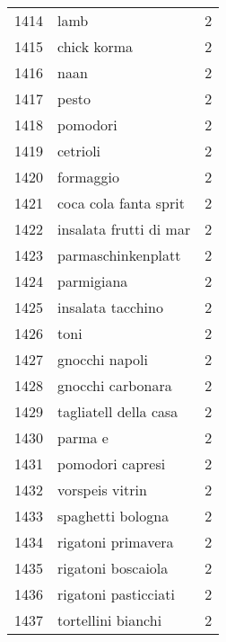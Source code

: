 \begin{tabular}{llr}
1414 &                                               lamb &      2 \\
1415 &                                        chick korma &      2 \\
1416 &                                               naan &      2 \\
1417 &                                              pesto &      2 \\
1418 &                                           pomodori &      2 \\
1419 &                                           cetrioli &      2 \\
1420 &                                          formaggio &      2 \\
1421 &                              coca cola fanta sprit &      2 \\
1422 &                             insalata frutti di mar &      2 \\
1423 &                                 parmaschinkenplatt &      2 \\
1424 &                                         parmigiana &      2 \\
1425 &                                  insalata tacchino &      2 \\
1426 &                                               toni &      2 \\
1427 &                                     gnocchi napoli &      2 \\
1428 &                                  gnocchi carbonara &      2 \\
1429 &                              tagliatell della casa &      2 \\
1430 &                                            parma e &      2 \\
1431 &                                   pomodori capresi &      2 \\
1432 &                                    vorspeis vitrin &      2 \\
1433 &                                  spaghetti bologna &      2 \\
1434 &                                 rigatoni primavera &      2 \\
1435 &                                 rigatoni boscaiola &      2 \\
1436 &                               rigatoni pasticciati &      2 \\
1437 &                                 tortellini bianchi &      2 \\

\end{tabular}

